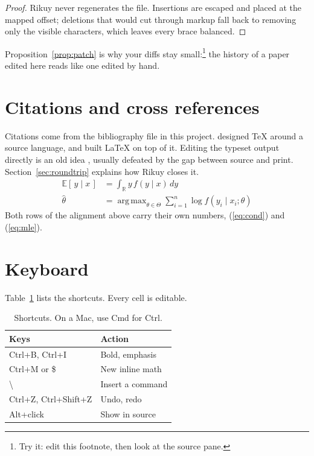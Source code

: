 \documentclass[11pt]{article}
\theoremstyle{definition}
\newcommand{\R}{\mathbb{R}}
\newcommand{\E}{\mathbb{E}}
\DeclareMathOperator*{\argmax}{arg\,max}
\begin{document}
\begin{proof}
Rikuy never regenerates the file. Insertions are escaped and placed at the mapped offset; deletions that would cut through markup fall back to removing only the visible characters, which leaves every brace balanced.
\end{proof}

Proposition~\ref{prop:patch} is why your diffs stay small:\footnote{Try it: edit this footnote, then look at the source pane.} the history of a paper edited here reads like one edited by hand.

\section{Citations and cross references}
Citations come from the bibliography file in this project. \citet{knuth1984} designed \TeX{} around a source language, and \citet{lamport1994} built \LaTeX{} on top of it. Editing the typeset output directly is an old idea \citep{kastrup2002, wen2018}, usually defeated by the gap between source and print. Section~\ref{sec:roundtrip} explains how Rikuy closes it.
\begin{align}
  \E[\,y \mid x\,] &= \int_{\R} y \, f(y \mid x)\, dy \label{eq:cond}\\
  \hat\theta &= \argmax_{\theta \in \Theta} \sum_{i=1}^{n} \log f(y_i \mid x_i; \theta) \label{eq:mle}
\end{align}
Both rows of the alignment above carry their own numbers, (\ref{eq:cond}) and (\ref{eq:mle}).

\section{Keyboard}
Table~\ref{tab:keys} lists the shortcuts. Every cell is editable.

\begin{table}[h]
\centering
\begin{tabular}{ll}
\toprule
Keys & Action \\
\midrule
Ctrl+B, Ctrl+I & Bold, emphasis \\
Ctrl+M or \$ & New inline math \\
\textbackslash & Insert a command \\
Ctrl+Z, Ctrl+Shift+Z & Undo, redo \\
Alt+click & Show in source \\
\bottomrule
\end{tabular}
\caption{Shortcuts. On a Mac, use Cmd for Ctrl.}\label{tab:keys}
\end{table}
\end{document}
